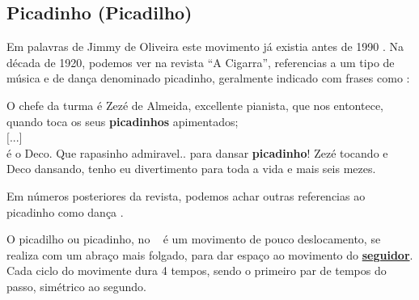 
\subsection{ Picadinho (Picadilho)}


Em palavras de Jimmy de Oliveira este movimento já existia antes de 1990 \cite{sambafunkeadoJimmyDeOliveiraPart1}.
Na década de 1920, podemos ver na revista ``A Cigarra'', 
referencias a um tipo de música e de dança denominado picadinho,
geralmente indicado com frases como \cite[pp. 13]{picadinho1}:
\begin{citando}
O chefe da turma é Zezé de Almeida, excellente pianista,
que nos entontece, quando toca os seus \textbf{picadinhos} apimentados;~\\
$[$...$]$~\\
é o Deco. Que rapasinho admiravel.. para dansar \textbf{picadinho}! 
Zezé tocando e Deco dansando, tenho eu divertimento 
para toda a vida e mais seis mezes.
\end{citando}
Em números posteriores da revista, 
podemos achar outras referencias ao picadinho como dança \cite[pp. 52]{picadinho2} \cite[pp. 49]{picadinho3}.


O picadilho ou picadinho, no \AnoLivro~ é um movimento de pouco deslocamento, 
se realiza com um abraço mais folgado, 
para dar espaço ao movimento do \hyperref[def:Seguidor]{\textbf{seguidor}}.
Cada ciclo do movimente dura 4 tempos, sendo o primeiro par de tempos do passo, simétrico ao segundo.


